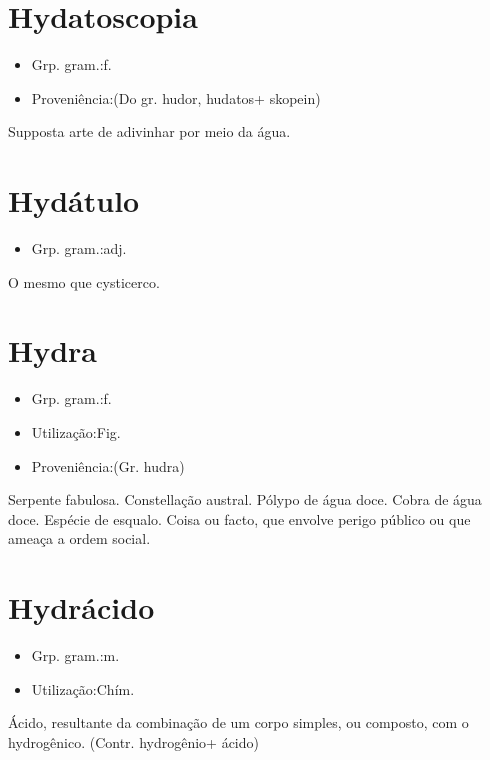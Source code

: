 \documentclass{article}
\begin{document}
\section{Hydatoscopia}
\begin{itemize}
\item {Grp. gram.:f.}
\end{itemize}
\begin{itemize}
\item {Proveniência:(Do gr. \textunderscore hudor\textunderscore , \textunderscore hudatos\textunderscore  + \textunderscore skopein\textunderscore )}
\end{itemize}
Supposta arte de adivinhar por meio da água.
\section{Hydátulo}
\begin{itemize}
\item {Grp. gram.:adj.}
\end{itemize}
O mesmo que \textunderscore cysticerco\textunderscore .
\section{Hydra}
\begin{itemize}
\item {Grp. gram.:f.}
\end{itemize}
\begin{itemize}
\item {Utilização:Fig.}
\end{itemize}
\begin{itemize}
\item {Proveniência:(Gr. \textunderscore hudra\textunderscore )}
\end{itemize}
Serpente fabulosa.
Constellação austral.
Pólypo de água doce.
Cobra de água doce.
Espécie de esqualo.
Coisa ou facto, que envolve perigo público ou que ameaça a ordem social.
\section{Hydrácido}
\begin{itemize}
\item {Grp. gram.:m.}
\end{itemize}
\begin{itemize}
\item {Utilização:Chím.}
\end{itemize}
Ácido, resultante da combinação de um corpo simples, ou composto, com o hydrogênico.
(Contr. \textunderscore hydrogênio\textunderscore  + \textunderscore ácido\textunderscore )
\end{document}
